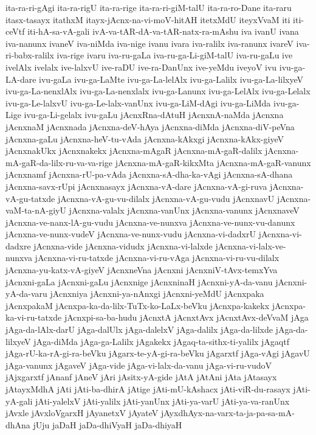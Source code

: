{ita-ra-ri-gAgi
ita-ra-rigU
ita-ra-rige
ita-ra-ri-giM-talU
ita-ra-ro-Dane
ita-raru
itasx-tasayx
itathxM
itayx-jAcnx-na-vi-moV-hitAH
itetxMdU
iteyxVvaM
iti
iti-ceVtf
iti-hA-sa-vA-gali
ivA-va-tAR-dA-va-tAR-natx-ra-mAshu
iva
ivanU
ivana
iva-nanunx
ivaneV
iva-niMda
iva-nige
ivanu
ivara
iva-ralilx
iva-ranunx
ivareV
iva-ri-babx-ralilx
iva-rige
ivaru
iva-ru-gaLa
iva-ru-ga-Li-giM-talU
iva-ru-gaLu
ive
ivelAlx
ivelalx
ive-lalxvU
ive-raDU
ive-ra-DanUnx
ive-yeMdu
iveyoV
ivu
ivu-ga-LA-dare
ivu-gaLa
ivu-ga-LaMte
ivu-ga-La-lelAlx
ivu-ga-Lalilx
ivu-ga-La-lilxyeV
ivu-ga-La-nenxlAlx
ivu-ga-La-nenxlalx
ivu-ga-Lanunx
ivu-ga-LelAlx
ivu-ga-Lelalx
ivu-ga-Le-lalxvU
ivu-ga-Le-lalx-vanUnx
ivu-ga-LiM-dAgi
ivu-ga-LiMda
ivu-ga-Lige
ivu-ga-Li-gelalx
ivu-gaLu
jAcnxRna-dAtuH
jAcnxnA-naMda
jAcnxna
jAcnxnaM
jAcnxnada
jAcnxna-deV-hAya
jAcnxna-diMda
jAcnxna-diV-peVna
jAcnxna-gaLu
jAcnxna-heV-tu-vAda
jAcnxna-kAkxgi
jAcnxna-kAkx-giyeV
jAcnxnakUkx
jAcnxnakekx
jAcnxna-mAgaR
jAcnxna-mA-gaR-dalilx
jAcnxna-mA-gaR-da-lilx-ru-va-va-rige
jAcnxna-mA-gaR-kikxMta
jAcnxna-mA-gaR-vanunx
jAcnxnamf
jAcnxna-rU-pa-vAda
jAcnxna-sA-dha-ka-vAgi
jAcnxna-sA-dhana
jAcnxna-savx-rUpi
jAcnxnasayx
jAcnxna-vA-dare
jAcnxna-vA-gi-ruva
jAcnxna-vA-gu-tatxde
jAcnxna-vA-gu-vu-dilalx
jAcnxna-vA-gu-vudu
jAcnxnavU
jAcnxna-vaM-ta-nA-giyU
jAcnxna-valalx
jAcnxna-vanUnx
jAcnxna-vanunx
jAcnxnaveV
jAcnxna-ve-nanx-lA-gu-vudu
jAcnxna-ve-nunxva
jAcnxna-ve-nunx-vu-danunx
jAcnxna-ve-nunx-vudeV
jAcnxna-ve-nunx-vudu
jAcnxna-vi-dadxrU
jAcnxna-vi-dadxre
jAcnxna-vide
jAcnxna-vidudx
jAcnxna-vi-lalxde
jAcnxna-vi-lalx-ve-nunxva
jAcnxna-vi-ru-tatxde
jAcnxna-vi-ru-vAga
jAcnxna-vi-ru-vu-dilalx
jAcnxna-yu-katx-vA-giyeV
jAcnxneVna
jAcnxni
jAcnxniV-tAvx-temxYva
jAcnxni-gaLa
jAcnxni-gaLu
jAcnxnige
jAcnxninaH
jAcnxni-yA-da-vanu
jAcnxni-yA-da-varu
jAcnxniya
jAcnxni-ya-nAnxgi
jAcnxni-yeMdU
jAcnxpaka
jAcnxpakaM
jAcnxpa-ka-da-lilx-TuTx-ko-LaLx-beVku
jAcnxpa-kakekx
jAcnxpa-ka-vi-ru-tatxde
jAcnxpi-sa-ba-hudu
jAcnxtA
jAcnxtAvx
jAcnxtAvx-deVvaM
jAga
jAga-da-lAlx-darU
jAga-dalUlx
jAga-dalelxV
jAga-dalilx
jAga-da-lilxde
jAga-da-lilxyeV
jAga-diMda
jAga-ga-Lalilx
jAgakekx
jAgaq-ta-sithx-ti-yalilx
jAgaqtf
jAga-rU-ka-rA-gi-ra-beVku
jAgarx-te-yA-gi-ra-beVku
jAgarxtf
jAga-vAgi
jAgavU
jAga-vanunx
jAgaveV
jAga-vide
jAga-vi-lalx-da-vanu
jAga-vi-ru-vudoV
jAjxgarxtf
jAnanf
jAneV
jAri
jAsitx-yA-gide
jAtA
jAtAni
jAta
jAtasayx
jAtayxMdhA
jAti
jAti-ba-dhirA
jAtige
jAti-mU-kAshacx
jAti-viR-du-rasayx
jAti-yA-gali
jAti-yalelxV
jAti-yalilx
jAti-yanUnx
jAti-ya-varU
jAti-ya-va-ranUnx
jAvxle
jAvxloVgarxH
jAyanetxV
jAyateV
jAyxdhAyx-na-varx-ta-ja-pa-sa-mA-dhAna
jUju
jaDaH
jaDa-dhiVyaH
jaDa-dhiyaH
}
